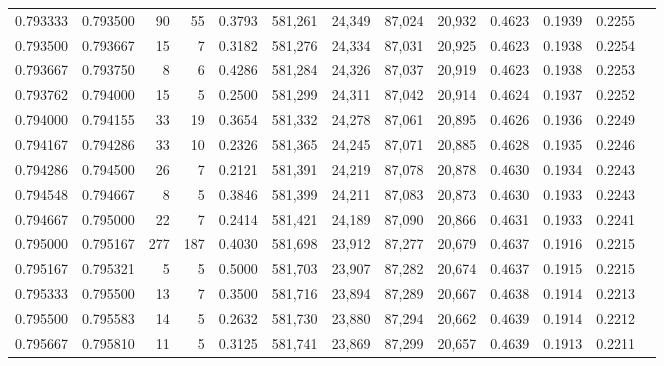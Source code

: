 \begin{tabular}{rrrrrrrrrrrrr}
0.793333 & 0.793500 &    90 &  55 &                                     0.3793 & 581,261 &  24,349 &  87,024 &  20,932 & 0.4623 & 0.1939 & 0.2255 \\
0.793500 & 0.793667 &    15 &   7 &                                     0.3182 & 581,276 &  24,334 &  87,031 &  20,925 & 0.4623 & 0.1938 & 0.2254 \\
0.793667 & 0.793750 &     8 &   6 &                                     0.4286 & 581,284 &  24,326 &  87,037 &  20,919 & 0.4623 & 0.1938 & 0.2253 \\
0.793762 & 0.794000 &    15 &   5 &                                     0.2500 & 581,299 &  24,311 &  87,042 &  20,914 & 0.4624 & 0.1937 & 0.2252 \\
0.794000 & 0.794155 &    33 &  19 &                                     0.3654 & 581,332 &  24,278 &  87,061 &  20,895 & 0.4626 & 0.1936 & 0.2249 \\
0.794167 & 0.794286 &    33 &  10 &                                     0.2326 & 581,365 &  24,245 &  87,071 &  20,885 & 0.4628 & 0.1935 & 0.2246 \\
0.794286 & 0.794500 &    26 &   7 &                                     0.2121 & 581,391 &  24,219 &  87,078 &  20,878 & 0.4630 & 0.1934 & 0.2243 \\
0.794548 & 0.794667 &     8 &   5 &                                     0.3846 & 581,399 &  24,211 &  87,083 &  20,873 & 0.4630 & 0.1933 & 0.2243 \\
0.794667 & 0.795000 &    22 &   7 &                                     0.2414 & 581,421 &  24,189 &  87,090 &  20,866 & 0.4631 & 0.1933 & 0.2241 \\
0.795000 & 0.795167 &   277 & 187 &                                     0.4030 & 581,698 &  23,912 &  87,277 &  20,679 & 0.4637 & 0.1916 & 0.2215 \\
0.795167 & 0.795321 &     5 &   5 &                                     0.5000 & 581,703 &  23,907 &  87,282 &  20,674 & 0.4637 & 0.1915 & 0.2215 \\
0.795333 & 0.795500 &    13 &   7 &                                     0.3500 & 581,716 &  23,894 &  87,289 &  20,667 & 0.4638 & 0.1914 & 0.2213 \\
0.795500 & 0.795583 &    14 &   5 &                                     0.2632 & 581,730 &  23,880 &  87,294 &  20,662 & 0.4639 & 0.1914 & 0.2212 \\
0.795667 & 0.795810 &    11 &   5 &                                     0.3125 & 581,741 &  23,869 &  87,299 &  20,657 & 0.4639 & 0.1913 & 0.2211 \\

\end{tabular}
